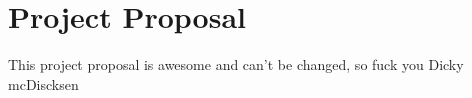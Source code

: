 \chapter{Project Proposal}
\label{ProjectProposal}

This project proposal is awesome and can't be changed, so fuck you Dicky mcDiscksen